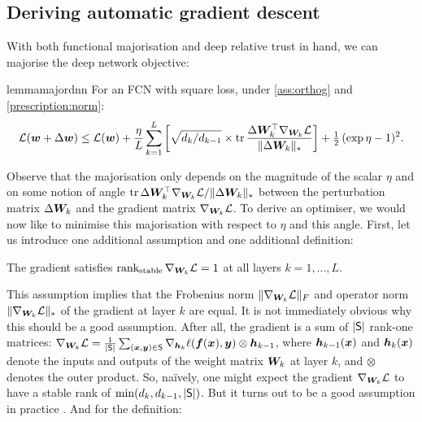 

\subsection{Deriving automatic gradient descent}

With both functional majorisation and deep relative trust in hand, we can majorise the deep network objective:



\begin{restatable}{lemma}{majordnn}\label{lem:sq-major-nn}
For an FCN with square loss, under \cref{ass:orthog} and \cref{prescription:norm}:
    \begin{equation*}
        \mathcal{L}({\bm{w}}+\Delta {\bm{w}}) \leq \mathcal{L}({\bm{w}}) + \frac{\eta}{L}\sum_{k=1}^L\left[\sqrt{d_k/d_{k-1}} \times\operatorname{tr}\frac{\Delta {\bm{W}}_k^\top\nabla_{{\bm{W}}_k}\mathcal{L}}{\Vert {\Delta {\bm{W}}_k} \Vert_*}\right] + \tfrac{1}{2} \,(\exp \eta -1)^2.
    \end{equation*}
\end{restatable}

Observe that the majorisation only depends on the magnitude of the scalar $\eta$ and on some notion of angle $\operatorname{tr}\Delta {\bm{W}}_k^\top\nabla_{{\bm{W}}_k}\mathcal{L}/\Vert {\Delta {\bm{W}}_k} \Vert_*$ between the perturbation matrix $\Delta {\bm{W}}_k$ and the gradient matrix $\nabla_{{\bm{W}}_k}\mathcal{L}$. To derive an optimiser, we would now like to minimise this majorisation with respect to $\eta$ and this angle. First, let us introduce one additional assumption and one additional definition:
\begin{assumption}\label{approx:g-cond} The gradient satisfies $\operatorname{rank_{stable}}\nabla_{{\bm{W}}_k}\mathcal{L}=1$ at all layers $k=1,...,L$.
\end{assumption}
This assumption implies that the Frobenius norm $\Vert {\nabla_{{\bm{W}}_k}\mathcal{L}} \Vert_F$ and operator norm $\Vert {\nabla_{{\bm{W}}_k}\mathcal{L}} \Vert_*$ of the gradient at layer $k$ are equal. It is not immediately obvious why this should be a good assumption. After all, the gradient is a sum of $\vert {\mathsf{S}} \vert$ rank-one matrices: $\nabla_{{\bm{W}}_k}\mathcal{L} = \tfrac{1}{\vert {\mathsf{S}} \vert} \sum_{({\bm{x}},{\bm{y}})\in\mathsf{S}} \nabla_{{\bm{h}}_k}\ell({\bm{f}}({\bm{x}}),{\bm{y}}) \otimes {\bm{h}}_{k-1}$, where ${\bm{h}}_{k-1}({\bm{x}})$ and ${\bm{h}}_k({\bm{x}})$ denote the inputs and outputs of the weight matrix ${\bm{W}}_k$ at layer $k$, and $\otimes$ denotes the outer product. So, naïvely, one might expect the gradient $\nabla_{{\bm{W}}_k}\mathcal{L}$ to have a stable rank of $\min(d_k,d_{k-1},\vert {\mathsf{S}} \vert)$. But it turns out to be a good assumption in practice \citep{Yang2021TensorPI,yang2021tuning}. And for the definition:

